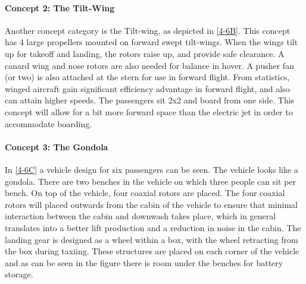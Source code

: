 \paragraph{Concept 2: The Tilt-Wing}
Another concept category is the Tilt-wing, as depicted in \autoref{4-6B}. This concept has 4 large propellers mounted on forward swept tilt-wings. When the wings tilt up for takeoff and landing, the rotors raise up, and provide safe clearance. A canard wing and nose rotors are also needed for balance in hover. A pusher fan (or two) is also attached at the stern for use in forward flight. From statistics, winged aircraft gain significant efficiency advantage in forward flight, and also can attain higher speeds. The passengers sit 2x2 and board from one side. This concept will allow for a bit more forward space than the electric jet in order to accommodate boarding.

\paragraph{Concept 3: The Gondola}
In \autoref{4-6C} a vehicle design for six passengers can be seen. The vehicle looks like a gondola. There are two benches in the vehicle on which three people can sit per bench. On top of the vehicle, four coaxial rotors are placed. The four coaxial rotors will placed outwards from the cabin of the vehicle to ensure that minimal interaction between the cabin and downwash takes place, which in general translates into a better lift production and a reduction in noise in the cabin. The landing gear is designed as a wheel within a box, with the wheel retracting from the box during taxiing. These structures are placed on each corner of the vehicle and as can be seen in the figure there is room under the benches for battery storage. 


